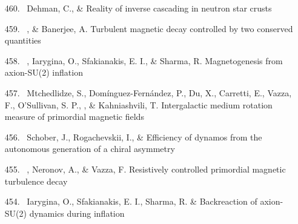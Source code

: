 \begin{itemize}

\item[{460.}~]
Dehman, C., \& \Brandenburg{}
{Reality of inverse cascading in neutron star crusts}

\item[{459.}~]
\Brandenburg, \& Banerjee, A.
{Turbulent magnetic decay controlled by two conserved quantities}

\item[{458.}~]
\Brandenburg, Iarygina, O., Sfakianakis, E. I., \& Sharma, R.
{Magnetogenesis from axion-SU(2) inflation}

\item[{457.}~]
Mtchedlidze, S., Dom\'inguez-Fern\'andez, P., Du, X., Carretti, E., Vazza, F., O'Sullivan, S. P., \Brandenburg, \& Kahniashvili, T.
{Intergalactic medium rotation measure of primordial magnetic fields}

\item[{456.}~]
Schober, J., Rogachevskii, I., \& \Brandenburg{}
{Efficiency of dynamos from the autonomous generation of a chiral asymmetry}

\item[{455.}~]
\Brandenburg, Neronov, A., \& Vazza, F.
{Resistively controlled primordial magnetic turbulence decay}

\item[{454.}~]
Iarygina, O., Sfakianakis, E. I., Sharma, R. \& \Brandenburg{}
{Backreaction of axion-SU(2) dynamics during inflation}


\end{itemize}
